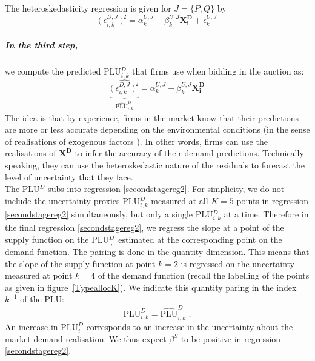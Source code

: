 The heteroskedasticity regression is given for $J=\{P,Q\}$ by
\begin{equation}
\label{heteroskedeqn}
 \bigl( \: \epsilon_{i,k}^{D,J}\: \bigr)^2= \alpha^{U,J}_{k} + \beta^{U,J}_{k} \boldsymbol{X^D_i} 
 +\epsilon^{U,J}_{k}
\end{equation}



\subparagraph{In the third step,} we compute the predicted PLU$^D_{i,k}$ that firms use when bidding in the auction as:
\begin{equation}
\label{predictu}
 \underbrace{ \widehat{ \bigl( \: \epsilon_{i,k}^{D,J}\: \bigr)^2}}_{\widehat{\text{PLU}}^D_{i,k}}= \alpha^{U,J}_{k} + \beta^{U,J}_{k} \boldsymbol{X^D_i} 
\end{equation}
The idea is that by experience, firms in the market know that their predictions are more or less accurate depending on the environmental conditions (in the sense of realisations of exogenous factors%
). In other words, firms can use the realisations of $ \boldsymbol{X^D}$ to infer the accuracy of their demand predictions. %
 Technically speaking, they can use the heteroskedastic nature of the residuals to forecast the level of uncertainty that they face.\\


The PLU$^{D}$ subs into regression \ref{secondstagereg2}. 
For simplicity, we do not include the uncertainty proxies PLU$^D_{i,k}$ measured at all $K=5$ points in regression \ref{secondstagereg2} simultaneously, but only a single PLU$^D_{i,k}$ at a time. 
Therefore in the final regression \ref{secondstagereg2}, we regress the slope at a point of the supply function on the PLU$^D_{.,.}$ estimated at the corresponding point on the demand function. The pairing is done in the quantity dimension. This means that the slope of the supply function at point $k=2$ is regressed on the uncertainty measured at point $k=4$ of the demand function (recall the labelling of the points as given in figure~\ref{TypeallocK}). We indicate this quantity paring in the index $k^{-1}$ of the PLU:
\begin{equation}
\label{levelproxy}
\text{PLU}^D_{i,k} = 
\widehat{\text{PLU}}^D_{i,k^{-1}} 
\end{equation}
An increase in PLU$^D_i$ corresponds to an increase in the uncertainty about the market demand realisation. We thus expect $\beta^S$ to be positive in regression \ref{secondstagereg2}.


